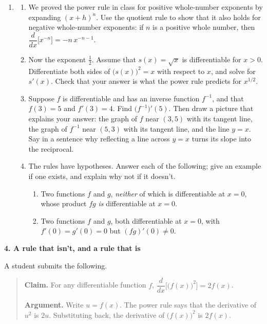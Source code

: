 \documentclass[11pt]{article}
\newcommand{\prob}[1]{\medskip\noindent\textbf{\large #1}\par\smallskip}
\begin{document}
\begin{enumerate}[resume]
\item[]
\begin{enumerate}
\item We proved the power rule in class for positive whole-number exponents by expanding
$(x+h)^n$. Use the quotient rule to show that it also holds for negative whole-number
exponents: if $n$ is a positive whole number, then
$\dfrac{d}{dx}\big[x^{-n}\big] = -n\,x^{-n-1}$.

\item Now the exponent $\tfrac12$. Assume that $s(x) = \sqrt{x}$ is differentiable for
$x > 0$. Differentiate both sides of $\big(s(x)\big)^2 = x$ with respect to $x$, and solve
for $s'(x)$. Check that your answer is what the power rule predicts for $x^{1/2}$.

\item Suppose $f$ is differentiable and has an inverse function $f^{-1}$, and that
$f(3) = 5$ and $f'(3) = 4$. Find $\big(f^{-1}\big)'(5)$. Then draw a picture that
explains your answer: the graph of $f$ near $(3,5)$ with its tangent line, the graph of
$f^{-1}$ near $(5,3)$ with its tangent line, and the line $y=x$. Say in a sentence why
reflecting a line across $y = x$ turns its slope into the reciprocal.

\item The rules have hypotheses. Answer each of the following; give an example if one
exists, and explain why not if it doesn't.
\begin{enumerate}
\item Two functions $f$ and $g$, \emph{neither} of which is differentiable at $x = 0$,
whose product $f g$ \emph{is} differentiable at $x = 0$.
\item Two functions $f$ and $g$, both differentiable at $x=0$, with $f'(0) = g'(0) = 0$
but $(fg)'(0) \neq 0$.
\end{enumerate}
\end{enumerate}
\end{enumerate}

\prob{4. A rule that isn't, and a rule that is}

A student submits the following.

\smallskip
\begin{quote}
\textbf{Claim.} For any differentiable function $f$,
$\dfrac{d}{dx}\Big[\big(f(x)\big)^2\Big] = 2f(x)$.

\textbf{Argument.} Write $u = f(x)$. The power rule says that the derivative of $u^2$ is
$2u$. Substituting back, the derivative of $\big(f(x)\big)^2$ is $2f(x)$.
\end{quote}
\smallskip
\end{document}
